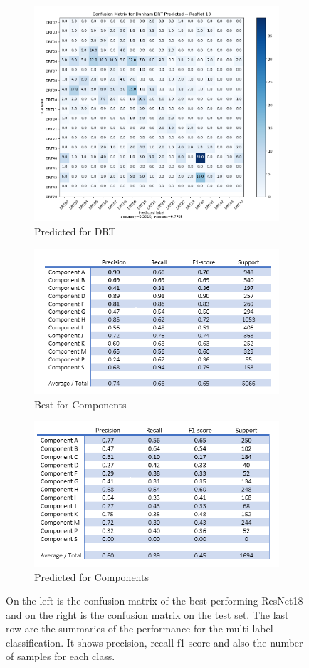 \begin{figure}
\begin{subfigure}{.5\textwidth}
  \includegraphics[width=.8\linewidth]{figures/04-drt_predicted.PNG}
  \caption{Predicted for DRT}
  \label{fig:rescmpred_drt}
\end{subfigure}
\begin{subfigure}{.5\textwidth}
  \centering
  \includegraphics[width=.8\linewidth]{figures/04-compo_best.PNG}
  \caption{Best for Components}
  \label{fig:rescompo_best}
\end{subfigure}%
\begin{subfigure}{.5\textwidth}
  \centering
  \includegraphics[width=.8\linewidth]{figures/04-compo_pred.PNG}
  \caption{Predicted for Components}
  \label{fig:rescompo_pred}
\end{subfigure}
\caption[Confusion matrices of classes trained on Resnet 18]{On the left is the confusion matrix of the best performing ResNet18 and on the right is the confusion matrix on the test set. The last row are the summaries of the performance for the multi-label classification. It shows precision, recall f1-score and also the number of samples for each class.}
\label{fig:rescm}
\end{figure}



